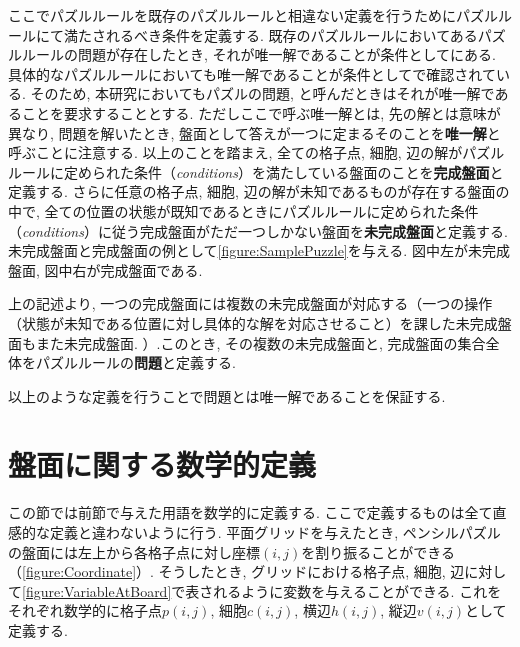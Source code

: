 ここでパズルルールを既存のパズルルールと相違ない定義を行うためにパズルルールにて満たされるべき条件を定義する. 既存のパズルルールにおいてあるパズルルールの問題が存在したとき, それが唯一解であることが条件としてにある. 具体的なパズルルールにおいても唯一解であることが条件としてで確認されている. そのため, 本研究においてもパズルの問題, と呼んだときはそれが唯一解であることを要求することとする. ただしここで呼ぶ唯一解とは, 先の解とは意味が異なり, 問題を解いたとき, 盤面として答えが一つに定まるそのことを\textbf{唯一解}と呼ぶことに注意する.
以上のことを踏まえ, 全ての格子点, 細胞, 辺の解がパズルルールに定められた条件（\textit{conditions}）を満たしている盤面のことを\textbf{完成盤面}と定義する. さらに任意の格子点, 細胞, 辺の解が未知であるものが存在する盤面の中で, 全ての位置の状態が既知であるときにパズルルールに定められた条件（\textit{conditions}）に従う完成盤面がただ一つしかない盤面を\textbf{未完成盤面}と定義する. 未完成盤面と完成盤面の例として\cref{figure:SamplePuzzle}を与える. 図中左が未完成盤面, 図中右が完成盤面である.



上の記述より, 一つの完成盤面には複数の未完成盤面が対応する（一つの操作（状態が未知である位置に対し具体的な解を対応させること）を課した未完成盤面もまた未完成盤面. ）.このとき, その複数の未完成盤面と, 完成盤面の集合全体をパズルルールの\textbf{問題}と定義する.

以上のような定義を行うことで問題とは唯一解であることを保証する.



\section{盤面に関する数学的定義}\label{section:MathematicalDefinition}
この節では前節で与えた用語を数学的に定義する. ここで定義するものは全て直感的な定義と違わないように行う.
平面グリッドを与えたとき, ペンシルパズルの盤面には左上から各格子点に対し座標$(i,j)$を割り振ることができる（\cref{figure:Coordinate}）. そうしたとき, グリッドにおける格子点, 細胞, 辺に対して\cref{figure:VariableAtBoard}で表されるように変数を与えることができる.
これをそれぞれ数学的に格子点$p(i,j)$, 細胞$c(i,j)$, 横辺$h(i,j)$, 縦辺$v(i,j)$として定義する.


